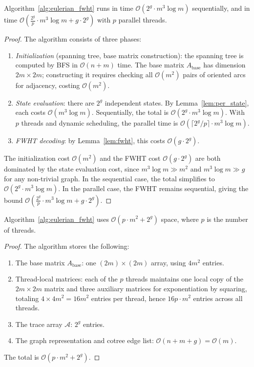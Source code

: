 \documentclass[acmsmall,review]{acmart}
\newcommand{\bigO}{\mathcal{O}}
\begin{document}
	\begin{theorem}
		\label{thm:time}
		Algorithm~\ref{alg:eulerian_fwht} runs in time $\bigO(2^g \cdot m^3 \log m)$ sequentially, and in time $\bigO\!\left(\frac{2^g}{p} \cdot m^3 \log m + g \cdot 2^g\right)$ with $p$ parallel threads.
	\end{theorem}
	\begin{proof}
		The algorithm consists of three phases:
		\begin{enumerate}
			\item \emph{Initialization} (spanning tree, base matrix construction): the spanning tree is computed by BFS in $\bigO(n + m)$ time. The base matrix $A_{\text{base}}$ has dimension $2m \times 2m$; constructing it requires checking all $\bigO(m^2)$ pairs of oriented arcs for adjacency, costing $\bigO(m^2)$.
			
			\item \emph{State evaluation}: there are $2^g$ independent states. By Lemma~\ref{lem:per_state}, each costs $\bigO(m^3 \log m)$. Sequentially, the total is $\bigO(2^g \cdot m^3 \log m)$. With $p$ threads and dynamic scheduling, the parallel time is $\bigO\!\left(\lceil 2^g / p \rceil \cdot m^3 \log m\right)$.
			
			\item \emph{FWHT decoding}: by Lemma~\ref{lem:fwht}, this costs $\bigO(g \cdot 2^g)$.
		\end{enumerate}
		The initialization cost $\bigO(m^2)$ and the FWHT cost $\bigO(g \cdot 2^g)$ are both dominated by the state evaluation cost, since $m^3 \log m \gg m^2$ and $m^3 \log m \gg g$ for any non-trivial graph. In the sequential case, the total simplifies to $\bigO(2^g \cdot m^3 \log m)$. In the parallel case, the FWHT remains sequential, giving the bound $\bigO\!\left(\frac{2^g}{p} \cdot m^3 \log m + g \cdot 2^g\right)$.
	\end{proof}
	
	\begin{theorem}
		\label{thm:space}
		Algorithm~\ref{alg:eulerian_fwht} uses $\bigO(p \cdot m^2 + 2^g)$ space, where $p$ is the number of threads.
	\end{theorem}
	\begin{proof}
		The algorithm stores the following:
		\begin{enumerate}
			\item The base matrix $A_{\text{base}}$: one $(2m) \times (2m)$ array, using $4m^2$ entries.
			\item Thread-local matrices: each of the $p$ threads maintains one local copy of the $2m \times 2m$ matrix and three auxiliary matrices for exponentiation by squaring, totaling $4 \times 4m^2 = 16m^2$ entries per thread, hence $16p \cdot m^2$ entries across all threads.
			\item The trace array $\mathcal{A}$: $2^g$ entries.
			\item The graph representation and cotree edge list: $\bigO(n + m + g) = \bigO(m)$.
		\end{enumerate}
		The total is $\bigO(p \cdot m^2 + 2^g)$.
	\end{proof}
	
\end{document}
